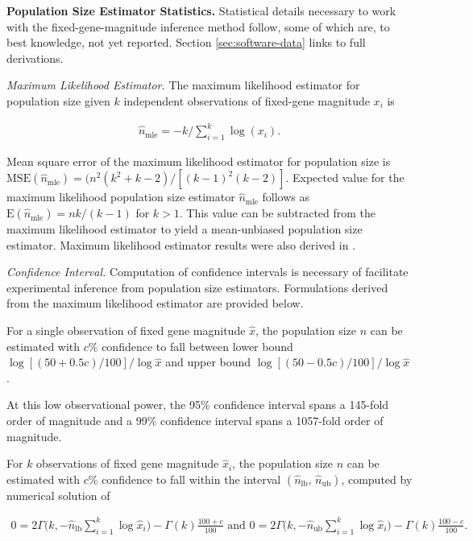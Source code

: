 \textbf{Population Size Estimator Statistics.}
Statistical details necessary to work with the fixed-gene-magnitude inference method follow, some of which are, to best knowledge, not yet reported.
Section \ref{sec:software-data} links to full derivations.

\textit{Maximum Likelihood Estimator.}
The maximum likelihood estimator for population size given $k$ independent observations of fixed-gene magnitude $x_i$ is
\begin{footnotesize}
\begin{align} \label{eqn:popsize_mle}
\hat{n}_\mathrm{mle} = -k/\textstyle\sum_{i=1}^k \log( x_i ).
\end{align}
\end{footnotesize}

Mean square error of the maximum likelihood estimator for population size is $\mathrm{MSE}(\hat{n}_\mathrm{mle}) = (n^2 (k^{2}+ k-2) / [(k-1)^{2}(k-2)]$.
Expected value for the maximum likelihood population size estimator $\hat{n}_\mathrm{mle}$ follows as $\mathrm{E}(\hat{n}_\mathrm{mle}) = nk/(k-1)$ for $k>1$.
This value can be subtracted from the maximum likelihood estimator to yield a mean-unbiased population size estimator.
Maximum likelihood estimator results were also derived in \citep{varagnolo2010distributed}.

\textit{Confidence Interval.}
Computation of confidence intervals is necessary of facilitate experimental inference from population size estimators.
Formulations derived from the maximum likelihood estimator are provided below.

For a single observation of fixed gene magnitude $\hat{x}$, the population size $n$ can be estimated with $c\%$ confidence to fall between lower bound $\log[(50+0.5c)/100] / \log\hat{x}$ and upper bound $\log[(50-0.5c)/100] / \log\hat{x}$.

At this low observational power, the 95\% confidence interval spans a 145-fold order of magnitude and a 99\% confidence interval spans a 1057-fold order of magnitude.

For $k$ observations of fixed gene magnitude $\hat{x}_i$, the population size $n$ can be estimated with $c\%$ confidence to fall within the interval $(\hat{n}_\mathrm{lb}, \, \hat{n}_\mathrm{ub})$, computed by numerical solution of

\begin{footnotesize}
\begin{align}
0
= 2\Gamma\Big(k, -\hat{n}_\mathrm{lb}\sum_{i=1}^k \log\hat{x}_i\Big) - \Gamma(k)\frac{100+c}{100} \text{ and }
0
= 2\Gamma\Big(k, -\hat{n}_\mathrm{ub}\sum_{i=1}^k \log\hat{x}_i\Big) - \Gamma(k)\frac{100-c}{100}.  \label{eqn:popsize_mle_ci}
\end{align}
\end{footnotesize}

